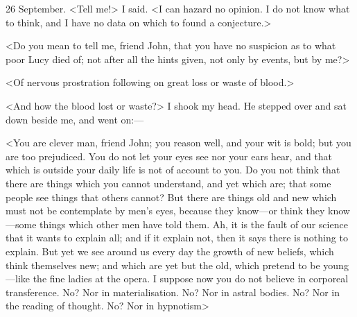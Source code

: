 \begin{diary}{26 September.}
<Tell me!> I said. <I can hazard no opinion. I do not know what to think, and I have no data on which to found a conjecture.>

<Do you mean to tell me, friend John, that you have no suspicion as to what poor Lucy died of; not after all the hints given, not only by events, but by me?>

<Of nervous prostration following on great loss or waste of blood.>

<And how the blood lost or waste?> I shook my head. He stepped over and sat down beside me, and went on:—

<You are clever man, friend John; you reason well, and your wit is bold; but you are too prejudiced. You do not let your eyes see nor your ears hear, and that which is outside your daily life is not of account to you. Do you not think that there are things which you cannot understand, and yet which are; that some people see things that others cannot? But there are things old and new which must not be contemplate by men's eyes, because they know—or think they know—some things which other men have told them. Ah, it is the fault of our science that it wants to explain all; and if it explain not, then it says there is nothing to explain. But yet we see around us every day the growth of new beliefs, which think themselves new; and which are yet but the old, which pretend to be young—like the fine ladies at the opera. I suppose now you do not believe in corporeal transference. No? Nor in materialisation. No? Nor in astral bodies. No? Nor in the reading of thought. No? Nor in hypnotism\longdash>


\end{diary}
